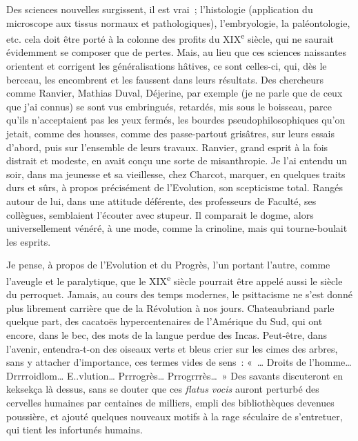 \documentclass[french,twoside]{book} %
\begin{document}
Des sciences nouvelles surgissent, il est vrai ; l’histologie (application du microscope aux tissus normaux et pathologiques), l’embryologie, la paléontologie, etc. cela doit être porté à la colonne des profits du XIX\textsuperscript{e} siècle, qui ne saurait évidemment se composer que de pertes. Mais, au lieu que ces sciences naissantes orientent et corrigent les généralisations hâtives, ce sont celles-ci, qui, dès le berceau, les encombrent et les faussent dans leurs résultats. Des chercheurs comme Ranvier, Mathias Duval, Déjerine, par exemple (je ne parle que de ceux que j’ai connus) se sont vus embringués, retardés, mis sous le boisseau, parce qu’ils n’acceptaient pas les yeux fermés, les bourdes pseudophilosophiques qu’on jetait, comme des housses, comme des passe-partout grisâtres, sur leurs essais d’abord, puis sur l’ensemble de leurs travaux. Ranvier, grand esprit à la fois distrait et modeste, en avait conçu une sorte de misanthropie. Je l’ai entendu un soir, dans ma jeunesse et sa vieillesse, chez Charcot, marquer, en quelques traits durs et sûrs, à propos précisément de l’Evolution, son scepticisme total. Rangés autour de lui, dans une attitude déférente, des professeurs de Faculté, ses collègues, semblaient l’écouter avec stupeur. Il comparait le dogme, alors universellement vénéré, à une mode, comme la crinoline, mais qui tourne-boulait les esprits.\par
Je pense, à propos de l’Evolution et du Progrès, l’un portant l’autre, comme l’aveugle et le paralytique, que le XIX\textsuperscript{e} siècle pourrait être appelé aussi le siècle du perroquet. Jamais, au cours des temps modernes, le psittacisme ne s’est donné plus librement carrière que de la Révolution à nos jours. Chateaubriand parle quelque part, des cacatoës hypercentenaires de l’Amérique du Sud, qui ont encore, dans le bec, des mots de la langue perdue des Incas. Peut-être, dans l’avenir, entendra-t-on des oiseaux verts et bleus crier sur les cimes des arbres, sans y attacher d’importance, ces termes vides de sens : « … Droits de l’homme… Drrrroidlom… E..vlution… Prrrogrès… Prrogrrrès… » Des savants discuteront en keksekça là dessus, sans se douter que ces {\itshape flatus vocis} auront perturbé des cervelles humaines par centaines de milliers, empli des bibliothèques devenues poussière, et ajouté quelques nouveaux motifs à la rage séculaire de s’entretuer, qui tient les infortunés humains.\par
\end{document}
